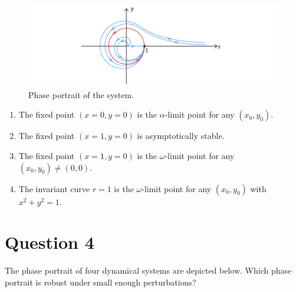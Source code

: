 \documentclass[twoside,10pt,a4paper]{article}
\begin{document}
\begin{figure}[H]
	\centering
	\includegraphics[scale=0.9]{Graphics/MCQ1_figures/Q16D01.pdf}
	\caption{Phase portrait of the system.}
\end{figure}

\begin{enumerate}[label=(\alph*)]
	\item The fixed point $(x = 0, y = 0)$ is the $\alpha$-limit point for any $(x_0, y_0)$.
	\item The fixed point $(x = 1, y = 0)$ is asymptotically stable.
	\item The fixed point $(x = 1, y = 0)$ is the $\omega$-limit point for any $(x_0, y_0) \neq (0,0)$.
	\item The invariant curve $r=1$ is the $\omega$-limit point for any $(x_0, y_0)$ with $x^2 + y^2 = 1$.
\end{enumerate}

\section*{Question 4}
The phase portrait of four dynamical systems are depicted below. Which phase portrait is robust under small enough perturbations?
\end{document}
